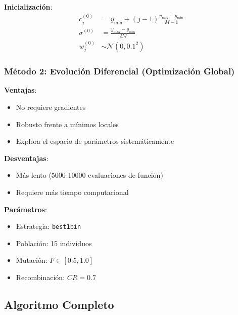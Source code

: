 \documentclass[11pt,a4paper]{article}
\begin{document}
\textbf{Inicialización}:
\begin{align}
c_j^{(0)} &= y_{\min} + (j-1)\frac{y_{\max} - y_{\min}}{M-1} \\
\sigma^{(0)} &= \frac{y_{\max} - y_{\min}}{2M} \\
w_j^{(0)} &\sim \mathcal{N}(0, 0.1^2)
\end{align}

\subsubsection{Método 2: Evolución Diferencial (Optimización Global)}

\textbf{Ventajas}:
\begin{itemize}
    \item No requiere gradientes
    \item Robusto frente a mínimos locales
    \item Explora el espacio de parámetros sistemáticamente
\end{itemize}

\textbf{Desventajas}:
\begin{itemize}
    \item Más lento (5000-10000 evaluaciones de función)
    \item Requiere más tiempo computacional
\end{itemize}

\textbf{Parámetros}:
\begin{itemize}
    \item Estrategia: \texttt{best1bin}
    \item Población: 15 individuos
    \item Mutación: $F \in [0.5, 1.0]$
    \item Recombinación: $CR = 0.7$
\end{itemize}

\subsection{Algoritmo Completo}
\end{document}
